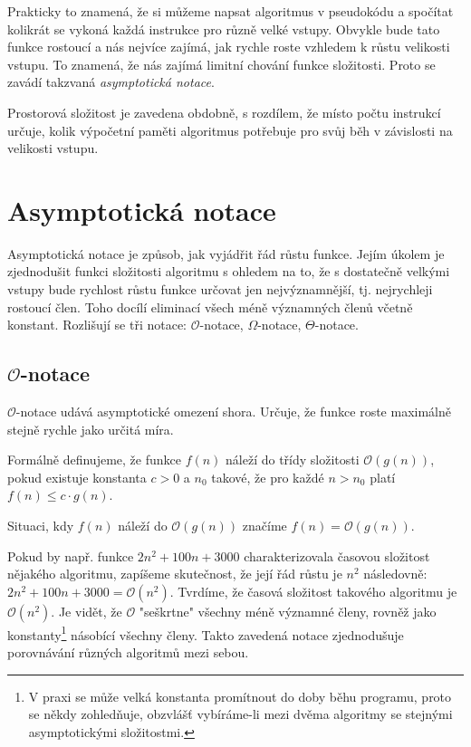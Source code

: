 \documentclass[12pt]{report}			%
\begin{document}
			
			Prakticky to znamená, že si můžeme napsat algoritmus v pseudokódu a spočítat kolikrát se vykoná každá instrukce pro různě velké vstupy. Obvykle bude tato funkce rostoucí a nás nejvíce zajímá, jak rychle roste vzhledem k růstu velikosti vstupu. To znamená, že nás zajímá limitní chování funkce složitosti. Proto se zavádí takzvaná \emph{asymptotická notace}.
			
			Prostorová složitost je zavedena obdobně, s rozdílem, že místo počtu instrukcí určuje, kolik výpočetní paměti algoritmus potřebuje pro svůj běh v závislosti na velikosti vstupu. \cite{pruvodce}
			\section{Asymptotická notace}
			Asymptotická notace je způsob, jak vyjádřit řád růstu funkce. Jejím úkolem je zjednodušit funkci složitosti algoritmu s ohledem na to, že s dostatečně velkými vstupy bude rychlost růstu funkce určovat jen nejvýznamnější, tj. nejrychleji rostoucí člen. Toho docílí eliminací všech méně významných členů včetně konstant. Rozlišují se tři notace: $\mathcal{O}$-notace, $\Omega$-notace, $\Theta$-notace. \cite{intro}
			
			\subsection{$\mathcal{O}$-notace}
			
			$\mathcal{O}$-notace udává asymptotické omezení shora. Určuje, že funkce roste maximálně stejně rychle jako určitá míra.
			
			Formálně definujeme, že funkce $f(n)$ náleží do třídy složitosti $\mathcal{O}(g(n))$, pokud existuje konstanta $c > 0$ a $n_0$ takové, že pro každé $n>n_0$ platí $f(n) \leq c \cdot g(n)$.
			
			Situaci, kdy $f(n)$ náleží do $\mathcal{O}(g(n))$ značíme $f(n) = \mathcal{O}(g(n))$.
			
			Pokud by např. funkce $2n^2+100n+3000$ charakterizovala časovou složitost nějakého algoritmu, zapíšeme skutečnost, že její řád růstu je $n^2$ následovně: $2n^2+100n+3000 = \mathcal{O}(n^2)$. Tvrdíme, že časová složitost takového algoritmu je $\mathcal{O}(n^2)$. Je vidět, že $\mathcal{O}$ "seškrtne" všechny méně významné členy, rovněž jako konstanty\footnote{V praxi se může velká konstanta promítnout do doby běhu programu, proto se někdy zohledňuje, obzvlášť vybíráme-li mezi dvěma algoritmy se stejnými asymptotickými složitostmi.} násobící všechny členy. Takto zavedená notace zjednodušuje porovnávání různých algoritmů mezi sebou.
			
\end{document}
